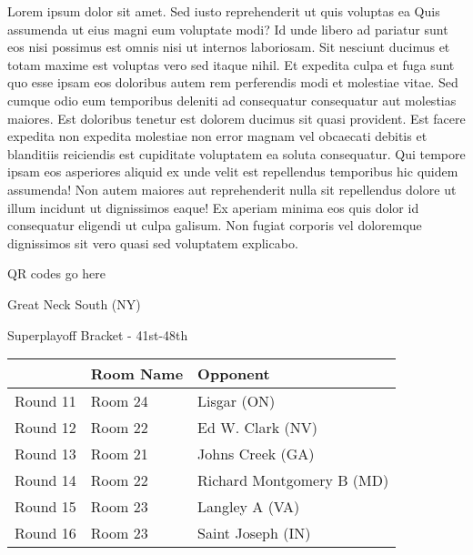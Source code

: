 \documentclass{article}%
\begin{document}
\vspace*{8pt}%
\linebreak%
\newline%
\newline%
    Lorem ipsum dolor sit amet. Sed iusto reprehenderit ut quis voluptas ea Quis assumenda ut eius magni eum voluptate modi? Id unde libero ad pariatur sunt eos nisi possimus est omnis nisi ut internos laboriosam. Sit nesciunt ducimus et totam maxime est voluptas vero sed itaque nihil. Et expedita culpa et fuga sunt quo esse ipsam eos doloribus autem rem perferendis modi et molestiae vitae.\newline%
\newline%
    Sed cumque odio eum temporibus deleniti ad consequatur consequatur aut molestias maiores. Est doloribus tenetur est dolorem ducimus sit quasi provident. Est facere expedita non expedita molestiae non error magnam vel obcaecati debitis et blanditiis reiciendis est cupiditate voluptatem ea soluta consequatur. Qui tempore ipsam eos asperiores aliquid ex unde velit est repellendus temporibus hic quidem assumenda!\newline%
\newline%
    Non autem maiores aut reprehenderit nulla sit repellendus dolore ut illum incidunt ut dignissimos eaque! Ex aperiam minima eos quis dolor id consequatur eligendi ut culpa galisum. Non fugiat corporis vel doloremque dignissimos sit vero quasi sed voluptatem explicabo.\newline%
\newline%
\vspace*{30pt}%
\begin{center}%
\begin{Huge}%
QR codes go here%
\end{Huge}%
\end{center}%
\newpage%
\begin{center}%
\begin{Huge}%
Great Neck South (NY)%
\end{Huge}%
\vspace*{8pt}%
\linebreak%
\begin{Large}%
Superplayoff Bracket {-} 41st{-}48th%
\end{Large}%
\end{center}%
%
\begin{tabularx}{\textwidth}{|c|Y|Y|}%
\hline%
&Room Name&Opponent\\%
\hline%
Round 11&Room 24&Lisgar (ON)\\%
Round 12&Room 22&Ed W. Clark (NV)\\%
Round 13&Room 21&Johns Creek (GA)\\%
Round 14&Room 22&Richard Montgomery B (MD)\\%
Round 15&Room 23&Langley A (VA)\\%
Round 16&Room 23&Saint Joseph (IN)\\%
\hline%
\end{tabularx}%
\end{document}
